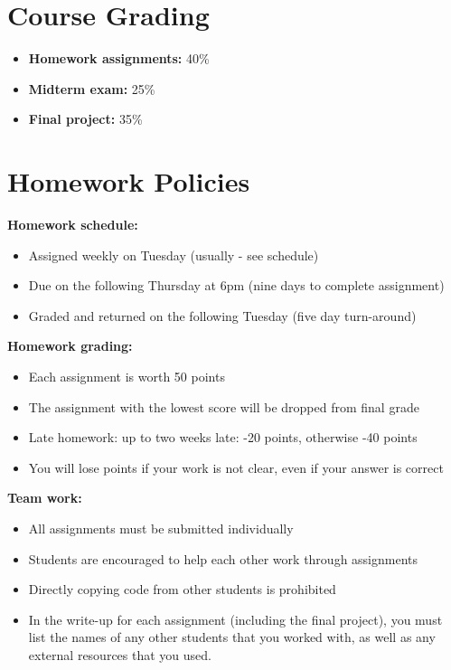 \documentclass[onecolumn]{article}
\begin{document}
\section*{Course Grading}

\vspace{-0.6em} \begin{itemize}  \setlength\itemsep{-0.4em}
\item \textbf{Homework assignments: } 40\%
\item \textbf{Midterm exam: } 25\%
\item \textbf{Final project: } 35\%
\end{itemize}

\section*{Homework Policies}

\textbf{Homework schedule:}
\vspace{-0.6em} \begin{itemize}  \setlength\itemsep{-0.4em}
  \item Assigned weekly on Tuesday (usually - see schedule)
  \item Due on the following Thursday at 6pm (nine days to complete assignment)
  \item Graded and returned on the following Tuesday (five day turn-around)
\end{itemize}

\textbf{Homework grading:}
  \vspace{-0.6em} \begin{itemize}  \setlength\itemsep{-0.4em}
  \item Each assignment is worth 50 points
  \item The assignment with the lowest score will be dropped from final grade
  \item Late homework: up to two weeks late: -20 points, otherwise -40 points
  \item You will lose points if your work is not clear, even if your answer is correct
\end{itemize}

\textbf{Team work:}
\vspace{-0.6em} \begin{itemize}  \setlength\itemsep{-0.4em}
  \item All assignments must be submitted individually
  \item Students are encouraged to help each other work through assignments
  \item Directly copying code from other students is prohibited
  \item In the write-up for each assignment (including the final project),
        you must list the names of any other students that you worked with,
        as well as any external resources that you used.
\end{itemize}
\end{document}
